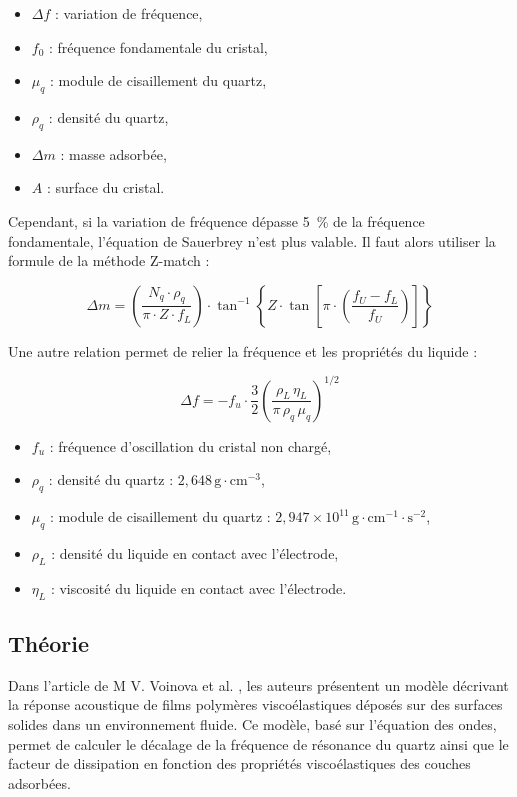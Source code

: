 \begin{itemize}[label=\textbullet]
    \item $\Delta f$ : variation de fréquence,
    \item $f_0$ : fréquence fondamentale du cristal,
    \item $\mu_q$ : module de cisaillement du quartz,
    \item $\rho_q$ : densité du quartz,
    \item $\Delta m$ : masse adsorbée,
    \item $A$ : surface du cristal.
\end{itemize}

Cependant, si la variation de fréquence dépasse 5~\% de la fréquence fondamentale, l’équation de Sauerbrey n’est plus valable.  
Il faut alors utiliser la formule de la méthode Z-match \cite{qcm100manual} :

\begin{equation}
    \Delta m = \left( \frac{N_q \cdot \rho_q}{\pi \cdot Z \cdot f_L} \right) 
    \cdot \tan^{-1} \left\{ Z \cdot \tan \left[ \pi \cdot \left( \frac{f_U - f_L}{f_U} \right) \right] \right\}
\end{equation}

Une autre relation permet de relier la fréquence et les propriétés du liquide :

\[
\Delta f = -f_u \cdot \frac{3}{2} \left( \frac{\rho_L \, \eta_L}{\pi \, \rho_q \, \mu_q} \right)^{1/2}
\]

\begin{itemize}[label=\textbullet]
    \item $f_u$ : fréquence d'oscillation du cristal non chargé,
    \item $\rho_q$ : densité du quartz : $2{,}648\, \text{g}\cdot\text{cm}^{-3}$,
    \item $\mu_q$ : module de cisaillement du quartz : $2{,}947 \times 10^{11}\, \text{g}\cdot\text{cm}^{-1}\cdot\text{s}^{-2}$,
    \item $\rho_L$ : densité du liquide en contact avec l’électrode,
    \item $\eta_L$ : viscosité du liquide en contact avec l’électrode.
\end{itemize}

\subsection{Théorie}

Dans l’article de M V. Voinova et al. \cite{M_V_Voinova_1999}, les auteurs présentent un modèle décrivant la réponse acoustique de films polymères viscoélastiques déposés sur des surfaces solides dans un environnement fluide.  
Ce modèle, basé sur l’équation des ondes, permet de calculer le décalage de la fréquence de résonance du quartz ainsi que le facteur de dissipation en fonction des propriétés viscoélastiques des couches adsorbées.

